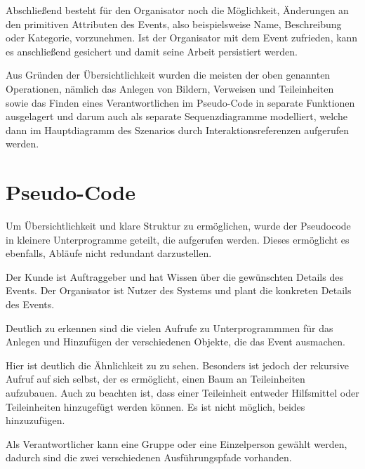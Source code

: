 Abschließend besteht für den Organisator noch die Möglichkeit, Änderungen an den primitiven Attributen des Events, also beispielsweise Name, Beschreibung oder Kategorie, vorzunehmen. Ist der Organisator mit dem Event zufrieden, kann es anschließend gesichert und damit seine Arbeit persistiert werden.

Aus Gründen der Übersichtlichkeit wurden die meisten der oben genannten Operationen, nämlich das Anlegen von Bildern, Verweisen und Teileinheiten sowie das Finden eines Verantwortlichen im Pseudo-Code in separate Funktionen ausgelagert und darum auch als separate Sequenzdiagramme modelliert, welche dann im Hauptdiagramm des Szenarios durch Interaktionsreferenzen aufgerufen werden. 

\section{Pseudo-Code}
Um Übersichtlichkeit und klare Struktur zu ermöglichen, wurde der Pseudocode in kleinere Unterprogramme geteilt, die aufgerufen werden. Dieses ermöglicht es ebenfalls, Abläufe nicht redundant darzustellen.

Der Kunde ist Auftraggeber und hat Wissen über die gewünschten Details des Events. Der Organisator ist Nutzer des Systems und plant die konkreten Details des Events.



Deutlich zu erkennen sind die vielen Aufrufe zu Unterprogrammmen für das Anlegen und Hinzufügen der verschiedenen Objekte, die das Event ausmachen.



Hier ist deutlich die Ähnlichkeit zu  zu sehen. Besonders ist jedoch der rekursive Aufruf auf sich selbst, der es ermöglicht, einen Baum an Teileinheiten aufzubauen. Auch zu beachten ist, dass einer Teileinheit entweder Hilfsmittel oder Teileinheiten hinzugefügt werden können. Es ist nicht möglich, beides hinzuzufügen.



Als Verantwortlicher kann eine Gruppe oder eine Einzelperson gewählt werden, dadurch sind die zwei verschiedenen Ausführungspfade vorhanden.

